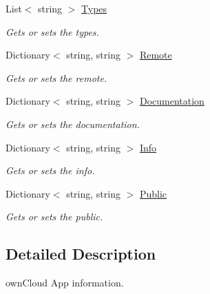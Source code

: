 \begin{DoxyCompactItemize}
List$<$ string $>$ \hyperlink{classowncloudsharp_1_1_types_1_1_app_info_a25a28396809e364a14eec89e477f1320}{Types}
\begin{DoxyCompactList}\small\item\em Gets or sets the types. \end{DoxyCompactList}\item 
Dictionary$<$ string, string $>$ \hyperlink{classowncloudsharp_1_1_types_1_1_app_info_a906b8dbb9f8441c356ba849098b225d5}{Remote}
\begin{DoxyCompactList}\small\item\em Gets or sets the remote. \end{DoxyCompactList}\item 
Dictionary$<$ string, string $>$ \hyperlink{classowncloudsharp_1_1_types_1_1_app_info_ae9ef7fbc3cdcf9f49cd7372d13249225}{Documentation}
\begin{DoxyCompactList}\small\item\em Gets or sets the documentation. \end{DoxyCompactList}\item 
Dictionary$<$ string, string $>$ \hyperlink{classowncloudsharp_1_1_types_1_1_app_info_ad3b2d2f748b0752b632d9034b19e4503}{Info}
\begin{DoxyCompactList}\small\item\em Gets or sets the info. \end{DoxyCompactList}\item 
Dictionary$<$ string, string $>$ \hyperlink{classowncloudsharp_1_1_types_1_1_app_info_a0b6d2de723405638ef59f17621b5f687}{Public}
\begin{DoxyCompactList}\small\item\em Gets or sets the public. \end{DoxyCompactList}\end{DoxyCompactItemize}


\subsection{Detailed Description}
own\+Cloud App information. 



